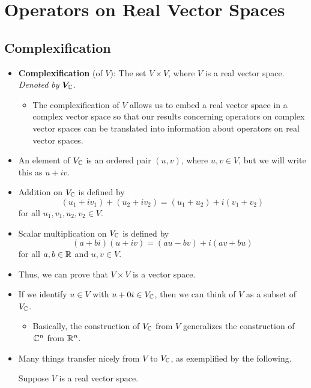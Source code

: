 \documentclass[../main.tex]{subfiles}
\begin{document}
\chapter{Operators on Real Vector Spaces}
\section{Complexification}
\begin{itemize}
    \item {}\textbf{Complexification} (of $V$): The set $V\times V$, where $V$ is a real vector space. \emph{Denoted by} $\bm{V_{\mathbb{C}}}$.
    \begin{itemize}
        \item The complexification of $V$ allows us to embed a real vector space in a complex vector space so that our results concerning operators on complex vector spaces can be translated into information about operators on real vector spaces.
    \end{itemize}
    \item An element of $V_{\mathbb{C}}$ is an ordered pair $(u,v)$, where $u,v\in V$, but we will write this as $u+iv$.
    \item Addition on $V_{\mathbb{C}}$ is defined by
    \begin{equation*}
        (u_1+iv_1)+(u_2+iv_2) = (u_1+u_2)+i(v_1+v_2)
    \end{equation*}
    for all $u_1,v_1,u_2,v_2\in V$.
    \item Scalar multiplication on $V_{\mathbb{C}}$ is defined by
    \begin{equation*}
        (a+bi)(u+iv) = (au-bv)+i(av+bu)
    \end{equation*}
    for all $a,b\in\mathbb{R}$ and $u,v\in V$.
    \item Thus, we can prove that $V\times V$ is a vector space.
    \item If we identify $u\in V$ with $u+0i\in V_{\mathbb{C}}$, then we can think of $V$ as a subset of $V_{\mathbb{C}}$.
    \begin{itemize}
        \item Basically, the construction of $V_{\mathbb{C}}$ from $V$ generalizes the construction of $\mathbb{C}^n$ from $\mathbb{R}^n$.
    \end{itemize}
    \item Many things transfer nicely from $V$ to $V_{\mathbb{C}}$, as exemplified by the following.
    \begin{theorem}
        Suppose $V$ is a real vector space.
        \begin{enumerate}[label={\textup{(}\alph*\textup{)}}]

\end{enumerate}
\end{theorem}
\end{itemize}
\end{document}
